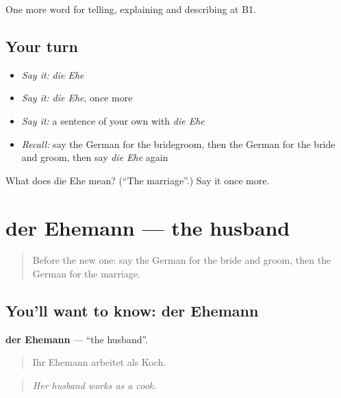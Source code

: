 \begin{grammarlens}[title={What you've built}]
One more word for telling, explaining and describing at B1.
\end{grammarlens}

\subsection*{Your turn}
\begin{itemize}
\raggedright
  \item \emph{Say it:} \emph{die Ehe}
  \item \emph{Say it:} \emph{die Ehe}, once more
  \item \emph{Say it:} a sentence of your own with \emph{die Ehe}
  \item \emph{Recall:} say the German for the bridegroom, then the German for the bride and groom, then say \emph{die Ehe} again
\end{itemize}

\begin{tcolorbox}[breakable,colback=teal!4,colframe=teal!35!black,title={Before you move on}]
What does die Ehe mean? (\textquotedblleft{}The marriage\textquotedblright{}.) Say it once more.
\end{tcolorbox}
\section[der Ehemann]{der Ehemann — the husband}

\label{lesson:GE-C299-ehemann}



\begin{quote}
Before the new one: say the German for the bride and groom, then the German for the marriage.
\end{quote}

\subsection*{You'll want to know: der Ehemann}
\textbf{der Ehemann} — \textquotedblleft{}the husband\textquotedblright{}.

\begin{quote}
Ihr Ehemann arbeitet als Koch.
\end{quote}

\begin{quote}
\emph{Her husband works as a cook.}
\end{quote}

